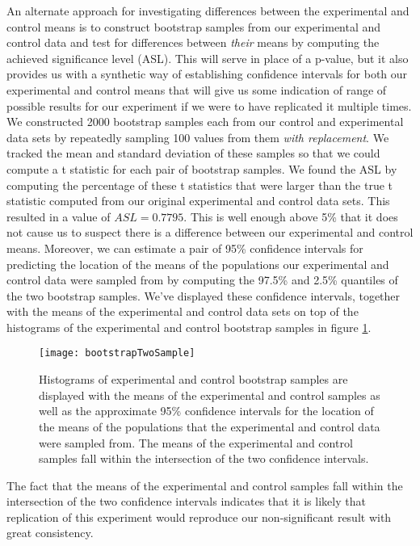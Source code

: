 \documentclass{amsart}
\begin{document}
An alternate approach for investigating differences between the experimental and control means is to construct bootstrap samples from our experimental and control data and test for differences between \textsl{their} means by computing the achieved significance level (ASL). This will serve in place of a p-value, but it also provides us with a synthetic way of establishing confidence intervals for both our experimental and control means that will give us some indication of range of possible results for our experiment if we were to have replicated it multiple times. We constructed 2000 bootstrap samples each from our control and experimental data sets by repeatedly sampling 100 values from them \textsl{with replacement}. We tracked the mean and standard deviation of these samples so that we could compute a t statistic for each pair of bootstrap samples. We found the ASL by computing the percentage of these t statistics that were larger than the true t statistic computed from our original experimental and control data sets. This resulted in a value of $ASL=0.7795$. This is well enough above 5\% that it does not cause us to suspect there is a difference between our experimental and control means. Moreover, we can estimate a pair of 95\% confidence intervals for predicting the location of the means of the populations our experimental and control data were sampled from by computing the 97.5\% and 2.5\% quantiles of the two bootstrap samples. We've displayed these confidence intervals, together with the means of the experimental and control data sets on top of the histograms of the experimental and control bootstrap samples in figure \ref{F:bootstrap}.
\begin{figure}[H]
\centering
\texttt{[image: bootstrapTwoSample]}
\caption{
Histograms of experimental and control bootstrap samples are displayed with the means of the experimental and control samples as well as the approximate 95\% confidence intervals for the location of the means of the populations that the experimental and control data were sampled from. The means of the experimental and control samples fall within the intersection of the two confidence intervals.\label{F:bootstrap}}
\end{figure}
The fact that the means of the experimental and control samples fall within the intersection of the two confidence intervals indicates that it is likely that replication of this experiment would reproduce our non-significant result with great consistency.
\end{document}
